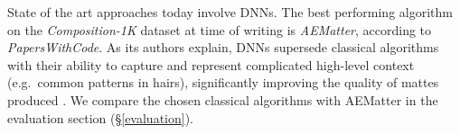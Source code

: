 \documentclass{article}
\theoremstyle{definition}
\begin{document}
\begin{multicols}{2}[]
State of the art approaches today involve DNNs. The best performing algorithm on the \emph{Composition-1K} dataset at time of writing is \emph{AEMatter}, according to \emph{PapersWithCode}. As its authors explain, DNNs supersede classical algorithms with their ability to capture and represent complicated high-level context (e.g.\ common patterns in hairs), significantly improving the quality of mattes produced \cite{sota-composition-1k}. We compare the chosen classical algorithms with AEMatter in the evaluation section (\S\ref{evaluation}).




\end{multicols}
\end{document}
